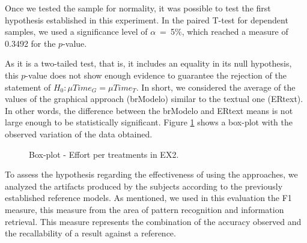 Once we tested the sample for normality, it was possible to test the first hypothesis established in this experiment.
In the paired T-test for dependent samples, we used a significance level of $\alpha$~=~5\%, which reached a measure of 0.3492 for the $p$-value.

As it is a two-tailed test, that is, it includes an equality in its null hypothesis, this $p$-value does not show enough evidence to guarantee the rejection of the statement of $H_0 : \mu Time_G = \mu Time_T$.
In short, we considered the average of the values of the graphical approach (brModelo) similar to the textual one (ERtext).
In other words, the difference between the brModelo and ERtext means is not large enough to be statistically significant.
Figure \ref{fig:boxplotTempo2} shows a box-plot with the observed variation of the data obtained.

\begin{figure}[!htb]
        \centering
        \caption{Box-plot - Effort per treatments in EX2.}
        \label{fig:boxplotTempo2}
        
\end{figure}

To assess the hypothesis regarding the effectiveness of using the approaches, we analyzed the artifacts produced by the subjects according to the previously established reference models.
As mentioned, we used in this evaluation the F1 measure, this measure from the area of pattern recognition and information retrieval.
This measure represents the combination of the accuracy observed and the recallability of a result against a reference.

